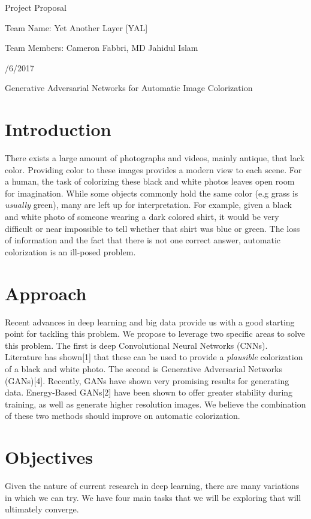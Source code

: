 \documentclass{article}
\begin{document}
\centerline{\sc \large Project Proposal}
\vspace{.5pc}
\centerline{\sc Team Name: Yet Another Layer [YAL]}
\centerline{\sc Team Members: Cameron Fabbri, MD Jahidul Islam}
\centerline{/6/2017}
\vspace{2pc}

\centerline{\sc \large Generative Adversarial Networks for Automatic Image Colorization }

\section{Introduction}
There exists a large amount of photographs and videos, mainly antique, that lack color.
Providing color to these images provides a modern view to each scene. For a human,
the task of colorizing these black and white photos leaves open room for imagination. While
some objects commonly hold the same color (e.g grass is \textit{usually} green), many are
left up for interpretation. For example, given a black and white photo of someone wearing a dark
colored shirt, it would be very difficult or near impossible to tell whether that shirt was
blue or green. The loss of information and the fact that there is not one correct answer,
automatic colorization is an ill-posed problem.

\section{Approach}
Recent advances in deep learning and big data provide us with a good starting point for tackling this
problem. We propose to leverage two specific areas to solve this problem. The first is deep Convolutional
Neural Networks (CNNs). Literature has shown[1] that these can be used to provide a \textit{plausible}
colorization of a black and white photo. The second is Generative Adversarial Networks (GANs)[4]. Recently,
GANs have shown very promising results for generating data. Energy-Based GANs[2] have been shown to
offer greater stability during training, as well as generate higher resolution images.
We believe the combination of these two methods should improve on automatic colorization.

\section{Objectives}
Given the nature of current research in deep learning, there are many variations in which we
can try. We have four main tasks that we will be exploring that will ultimately converge.
\end{document}
